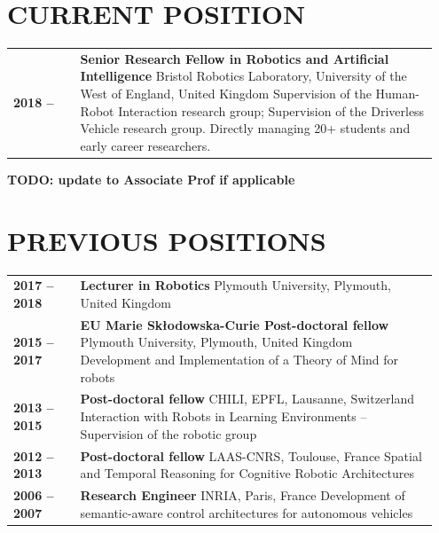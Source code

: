 \documentclass[11pt]{report}
\newcommand{\TODO}[1]{{\color{red}\textbf{TODO: #1}}}
\begin{document}
\section{CURRENT POSITION}

\begin{tabular}{p{0.15\linewidth}p{0.8\linewidth}}
    \bf 2018 -- & {\bf Senior Research Fellow in Robotics and Artificial
    Intelligence}
    \newline Bristol Robotics Laboratory, University of the West of England,
    United Kingdom 
    \newline \small Supervision of the Human-Robot Interaction research group; Supervision of the Driverless Vehicle research group.
Directly managing 20+ students and early career researchers. \\
\end{tabular}

\TODO{update to Associate Prof if applicable}

\section{PREVIOUS POSITIONS}

\begin{tabular}{p{0.15\linewidth}p{0.8\linewidth}}
    \bf 2017 -- 2018 & {\bf Lecturer in Robotics} \newline Plymouth University, Plymouth, United Kingdom \\
    \bf 2015 -- 2017 & {\bf EU Marie Skłodowska-Curie Post-doctoral fellow}
    \newline Plymouth University, Plymouth, United Kingdom \newline \small
    Development and Implementation of a Theory of Mind for robots \\
    \bf 2013 -- 2015 & {\bf Post-doctoral fellow} \newline CHILI, EPFL,
    Lausanne, Switzerland \newline \small Interaction with Robots in Learning
    Environments – Supervision of the robotic group \\
    \bf 2012 -- 2013 & {\bf Post-doctoral fellow} \newline LAAS-CNRS, Toulouse,
    France \newline \small Spatial and Temporal Reasoning for Cognitive Robotic
    Architectures\\
    \bf 2006 -- 2007 & {\bf Research Engineer} \newline INRIA, Paris, France
    \newline \small Development of semantic-aware control architectures for
    autonomous vehicles \\
\end{tabular}
\end{document}

